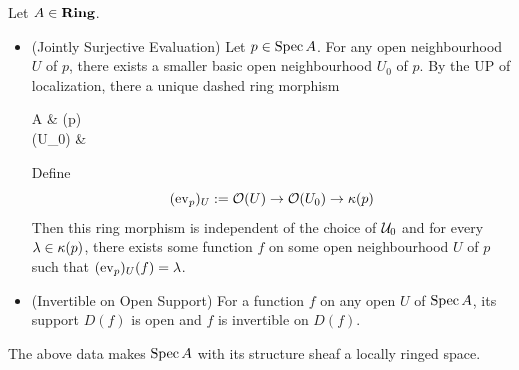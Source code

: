\begin{prop}
  
  Let $A \in \mathbf{Ring}$.
  \begin{itemize}
    \item (Jointly Surjective Evaluation)
    Let $p \in \operatorname{Spec} A$.
    For any open neighbourhood $U$ of $p$,
    there exists a smaller basic open neighbourhood $U_0$ of $p$.
    By the UP of localization, 
    there a unique dashed ring morphism 
    \begin{cd}
      A \ar[r,"\ev_p"] \ar[d]& \ka(p) \\
      \OO(U_0) \ar[ru,dashed] & 
    \end{cd}
    Define \[
      (\operatorname{ev}_p)_U := \mathcal{O}(U) \to \mathcal{O}(U_0) \to \kappa(p)
    \]
    Then this ring morphism is independent of the choice of $\mathcal{U}_0$
    and for every $\lambda \in \kappa(p)$,
    there exists some function $f$ on some open neighbourhood $U$ of $p$
    such that $(\operatorname{ev}_p)_U(f) = \lambda$.
    \item (Invertible on Open Support)
    For a function $f$ on any open $U$ of $\operatorname{Spec} A$,
    its support $D(f)$ is open and $f$ is invertible on $D(f)$.
  \end{itemize}
  The above data makes $\operatorname{Spec} A$ with its structure sheaf a 
  locally ringed space. 


\end{prop}
